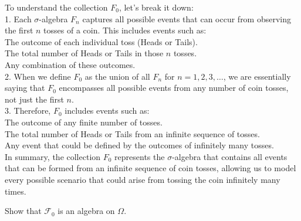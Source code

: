 \begin{solution}
    To understand the collection \( F_0 \), let's break it down:\\

    1. Each \(\sigma\)-algebra \( F_n \) captures all possible events that can occur from observing the first \( n \) tosses of a coin. This includes events such as:\\
    
    The outcome of each individual toss (Heads or Tails).\\
    The total number of Heads or Tails in those \( n \) tosses.\\
    Any combination of these outcomes.\\
    
    2. When we define \( F_0 \) as the union of all \( F_n \) for \( n = 1, 2, 3, \ldots \), we are essentially saying that \( F_0 \) encompasses all possible events from any number of coin tosses, not just the first \( n \).\\
    
    3. Therefore, \( F_0 \) includes events such as:\\
    
    The outcome of any finite number of tosses.\\
    The total number of Heads or Tails from an infinite sequence of tosses.\\
    Any event that could be defined by the outcomes of infinitely many tosses.\\
    
    In summary, the collection \( F_0 \) represents the \(\sigma\)-algebra that contains all events that can be formed from an infinite sequence of coin tosses, allowing us to model every possible scenario that could arise from tossing the coin infinitely many times.
\end{solution}

\begin{exercise}
    Show that \(\mathcal{F}_0\) is an algebra on \(\Omega\).
\end{exercise}

